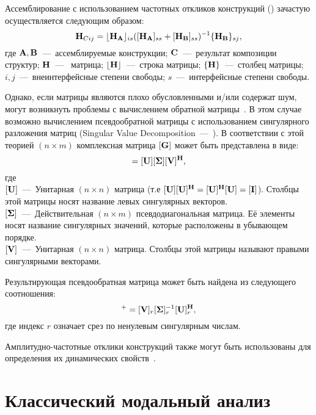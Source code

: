 Ассемблирование с использованием частотных откликов конструкций () зачастую осуществляется следующим образом:
\begin{equation}
	\mathbf{H}_{Cij} = \lfloor \mathbf{H}_{\mathbf{A}} \rfloor_{is} ([\mathbf{H}_{\mathbf{A}}]_{ss} + [\mathbf{H}_{\mathbf{B}}]_{ss})^{-1} \{ \mathbf{H}_{\mathbf{B}} \}_{sj},
\end{equation}
где $\mathbf{A}, \mathbf{B}$~---~ассемблируемые конструкции; $\mathbf{C}$~---~результат композиции структур; $\mathbf{H}$~---~ матрица; $\lfloor \mathbf{H} \rfloor$~---~строка  матрицы; $\{ \mathbf{H} \}$~---~столбец  матрицы; $ i, j $~---~внеинтерфейсные степени свободы; $ s $~---~интерфейсные степени свободы.

Однако, если матрицы являются плохо обусловленными и/или содержат шум, могут возникнуть проблемы с вычислением обратной матрицы~\cite{lib:coupling:Gialamas}. В этом случае возможно вычислением псевдообратной матрицы с использованием сингулярного разложения матриц (Singular Value Decomposition~---~). В соответствии с этой теорией $ (n \times m) $ комплексная матрица $ [\mathbf{G}] $ может быть представлена в виде:
\begin{equation}
	[\mat{G}] = [\mat{U}][\mat{\Sigma}][\mat{V}] ^ \mat{H},
\end{equation}
где \\
$ [\mathbf{U}] $~---~Унитарная $(n \times n)$ матрица (т.е $ [\mathbf{U}][\mathbf{U}] ^ {\mathbf{H}} = [\mathbf{U}] ^ {\mathbf{H}}[\mathbf{U}] = [\mathbf{I}] $). Столбцы этой матрицы носят название левых сингулярных векторов. \\
$[\mathbf{\Sigma}]$~---~Действительная $(n \times m)$ псевдодиагональная матрица. Её элементы носят название сингулярных значений, которые расположены в убывающем порядке. \\
$[\mathbf{V}]$~---~Унитарная ${(n \times n)}$ матрица. Столбцы этой матрицы называют правыми сингулярными векторами. 

Результирующая псевдообратная матрица может быть найдена из следующего соотношения:
\begin{equation}
	[\mat{G}]^{+} = [\mat{V}]_r [\mat{\Sigma}]_r ^ {-1} [\mat{U}]_r ^ \mat{H},
\end{equation}
где индекс $ r $ означает срез по ненулевым сингулярным числам.

Амплитудно-частотные отклики конструкций также могут быть использованы для определения их динамических свойств~\cite{lib:coupling:Xi, lib:coupling:Malekjafarian}.

\section{Классический модальный анализ}

